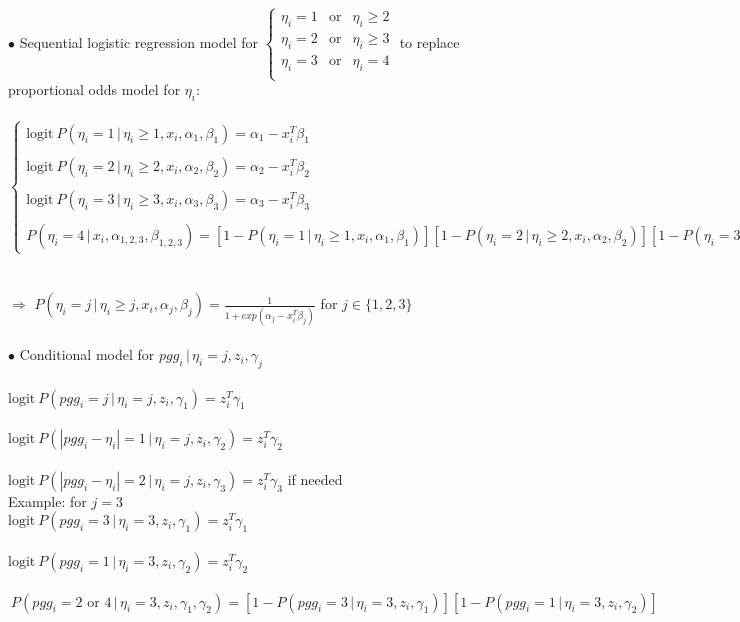 \documentclass{article}
\newcommand{\given}{\, | \,}
\begin{document}
	$\bullet$ Sequential logistic regression model for $\left\{
	\begin{array}{lll}
		\eta_i = 1 & \text{or} & \eta_i \geq 2\\
		\eta_i = 2 & \text{or}& \eta_i \geq 3 \\
		\eta_i = 3 & \text{or}& \eta_i = 4 \\
	\end{array}
	\right.$ 
	to replace proportional odds model for $\eta_i$:
	\\ 
	\\
	$\left\{
	\begin{array}{l}
		\text{logit}  \ P(\eta_i = 1 \given \eta_i \geq 1, x_i,\alpha_{1}, \beta_{1}) = \alpha_{1} - x_i^T \beta_{1} \\
		\\
		\text{logit}  \ P(\eta_i = 2 \given \eta_i \geq 2,x_i, \alpha_{2}, \beta_{2}) = \alpha_{2} - x_i^T \beta_{2} \\
		\\
		\text{logit}  \ P(\eta_i = 3 \given \eta_i \geq 3,x_i, \alpha_{3}, \beta_{3}) =  \alpha_{3} - x_i^T \beta_{3} \\
		\\
		P(\eta_i = 4 \given x_i, \alpha_{1,2,3},\beta_{1,2,3}) = 
		[1-P(\eta_i = 1 \given \eta_i \geq 1, x_i, \alpha_{1}, \beta_{1})]  
		[1-P(\eta_i = 2 \given \eta_i \geq 2,x_i, \alpha_{2},	\beta_{2})] 
		[1-P(\eta_i = 3 \given \eta_i \geq 3,x_i, \alpha_{3},\beta_{3})]		
	\end{array}
	\right.$ 	\\
	\\
	\\
	$\Rightarrow$ $P(\eta_i = j \given \eta_i \geq j, x_i, \alpha_j,\beta_j) = \frac{1}{1+exp(\alpha_j - x_i^T \beta_{j})}$ for $j \in \{1,2,3\}$
\\
\\


$\bullet$ Conditional model for $pgg_i \given \eta_i = j, z_i, \gamma_j$ 
\\
\\
$\text{logit} \ P(pgg_i = j \given \eta_i = j, z_i, \gamma_1) = z_i^T \gamma_1$
\\
\\
$\text{logit} \ P( |pgg_i - \eta_i| = 1 \given \eta_i = j, z_i, \gamma_2)= z_i^T \gamma_2$
\\
\\
$\text{logit} \ P( |pgg_i - \eta_i| = 2 \given \eta_i = j, z_i, \gamma_3)= z_i^T \gamma_3$ if needed
\\

Example: for $j = 3$
\\
$\text{logit} \ P(pgg_i = 3 \given \eta_i = 3, z_i, \gamma_1) = z_i^T \gamma_1$
\\
\\
$\text{logit} \ P( pgg_i =1  \given \eta_i = 3, z_i, \gamma_2)= z_i^T \gamma_2$
\\
\\
$\ P( pgg_i = 2  \text{ or } 4 \given \eta_i = 3, z_i, \gamma_1, \gamma_2)= [1-P(pgg_i = 3 \given \eta_i = 3,z_i, \gamma_1)][1-P(pgg_i = 1 \given \eta_i = 3,z_i, \gamma_2)]$
\\
\end{document}
